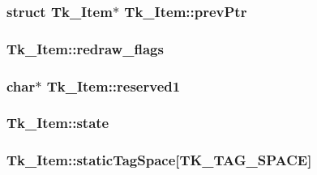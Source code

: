 \subsubsection[{\texorpdfstring{prev\+Ptr}{prevPtr}}]{\setlength{\rightskip}{0pt plus 5cm}struct {\bf Tk\+\_\+\+Item}$\ast$ Tk\+\_\+\+Item\+::prev\+Ptr}\hypertarget{struct_tk___item_aa91f5c8c1644698bcc325fe341f6eb4b}{}\label{struct_tk___item_aa91f5c8c1644698bcc325fe341f6eb4b}
\subsubsection[{\texorpdfstring{redraw\+\_\+flags}{redraw_flags}}]{ Tk\+\_\+\+Item\+::redraw\+\_\+flags}\hypertarget{struct_tk___item_a50941534e2fba5830217ee44f25dc799}{}\label{struct_tk___item_a50941534e2fba5830217ee44f25dc799}
\subsubsection[{\texorpdfstring{reserved1}{reserved1}}]{\setlength{\rightskip}{0pt plus 5cm}char$\ast$ Tk\+\_\+\+Item\+::reserved1}\hypertarget{struct_tk___item_a60db64f7b86f16c19861f9ac5c6b4a41}{}\label{struct_tk___item_a60db64f7b86f16c19861f9ac5c6b4a41}
\subsubsection[{\texorpdfstring{state}{state}}]{ Tk\+\_\+\+Item\+::state}\hypertarget{struct_tk___item_a7849c5f06a0c1906be9d01d5a541041e}{}\label{struct_tk___item_a7849c5f06a0c1906be9d01d5a541041e}
\subsubsection[{\texorpdfstring{static\+Tag\+Space}{staticTagSpace}}]{ Tk\+\_\+\+Item\+::static\+Tag\+Space\mbox{[}{\bf T\+K\+\_\+\+T\+A\+G\+\_\+\+S\+P\+A\+CE}\mbox{]}}\hypertarget{struct_tk___item_abf015c60d26597fbc5ed25ee4247c8d0}{}\label{struct_tk___item_abf015c60d26597fbc5ed25ee4247c8d0}
